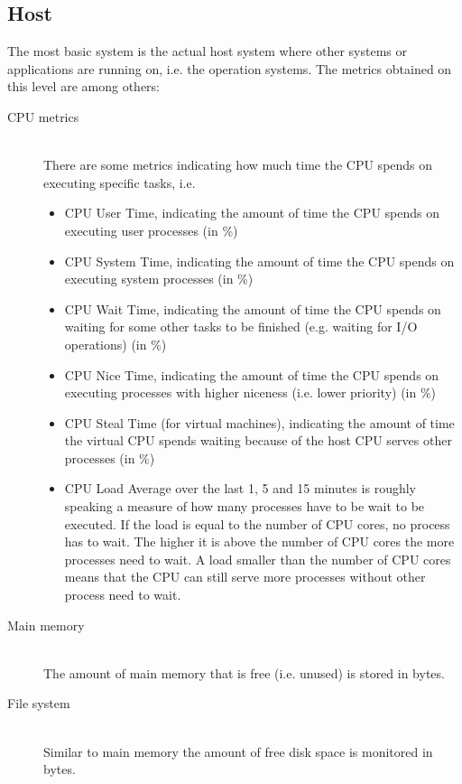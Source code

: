 \documentclass[]{article}
\begin{document}
\subsection{Host}
The most basic system is the actual host system where other systems or applications are running on, i.e. the operation systems.
The metrics obtained on this level are among others:

\begin{description}
	\item[CPU metrics] \hfill \\
	There are some metrics indicating how much time the CPU spends on executing specific tasks, i.e.
	\begin{itemize}
		\item CPU User Time, indicating the amount of time the CPU spends on executing user processes (in \%)
		\item CPU System Time, indicating the amount of time the CPU spends on executing system processes (in \%)
		\item CPU Wait Time, indicating the amount of time the CPU spends on waiting for some other tasks to be finished (e.g. waiting for I/O operations) (in \%)
		\item CPU Nice Time, indicating the amount of time the CPU spends on executing processes with higher niceness (i.e. lower priority) (in \%)
		\item CPU Steal Time (for virtual machines), indicating the amount of time the virtual CPU spends waiting because of the host CPU serves other processes (in \%)
		\item CPU Load Average over the last 1, 5 and 15 minutes is roughly speaking a measure of how many processes have to be wait to be executed. If the load is equal to the number of CPU cores, no process has to wait. The higher it is above the number of CPU cores the more processes need to wait. A load smaller than the number of CPU cores means that the CPU can still serve more processes without other process need to wait.
	\end{itemize}
	
	\item[Main memory] \hfill \\
	The amount of main memory that is free (i.e. unused) is stored in bytes.
	
	\item[File system] \hfill\\
	Similar to main memory the amount of free disk space is monitored in bytes.
\end{description}
\end{document}
